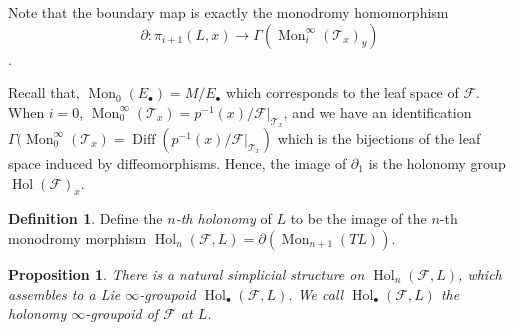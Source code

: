 \documentclass[12pt]{amsart}
\newtheorem{prop}[thm]{Proposition}
\theoremstyle{definition}
\newtheorem{defn}[thm]{Definition}
\theoremstyle{remark}
\numberwithin{equation}{section}
\newcommand{\del}{\partial}
\renewcommand{\del}{\partial}
\newcommand{\CF}{{\mathcal F}}
\newcommand{\1}{{\mathbb{1}}}
\newcommand{\Diff}{\operatorname{Diff}}
\newcommand{\mon}{\operatorname{Mon}}
\newcommand{\hol}{\operatorname{Hol}}
\begin{document}
Note that the boundary map is exactly the monodromy homomorphism $$\del: \pi_{i+1}(L,x) \stackrel{}{\to} \Gamma(\mon^{\infty}_i(\mathcal{T}_x)_y)$$.

Recall that, $\mon_0(E_{\bullet}) = M/E_{\bullet}$ which corresponds to the leaf space of $\CF$.
When $i = 0$, $\mon^{\infty}_0(\mathcal{T}_x) = p^{-1}(x)/\CF|_{\mathcal{T}_x}$, and we have an identification $\Gamma(\mon^{\infty}_0(\mathcal{T}_x) = \Diff(p^{-1}(x)/\CF|_{\mathcal{T}_x})$ which is the bijections of the leaf space induced by diffeomorphisms. Hence, the image of $\del_1$ is the holonomy group $\hol(\CF)_x$.

\begin{defn}
    Define the {\it $n$-th holonomy} of $L$ to be the image of the $n$-th monodromy morphism $\hol_n(\CF, L) = \del(\mon_{n+1}(TL))$.
\end{defn}

\begin{prop}
There is a natural simplicial structure on $\hol_n(\CF, L)$, which assembles to a Lie $\infty$-groupoid $\hol_{\bullet}(\CF, L)$. We call $\hol_{\bullet}(\CF, L)$ the holonomy $\infty$-groupoid of $\CF$ at $L$.
\end{prop}
\end{document}

